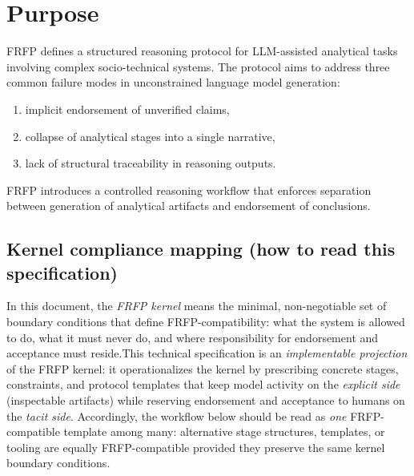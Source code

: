 
\section{Purpose}

FRFP defines a structured reasoning protocol for LLM-assisted analytical tasks involving complex socio-technical systems. The protocol aims to address three common failure modes in unconstrained language model generation:

\begin{enumerate}
\item implicit endorsement of unverified claims,
\item collapse of analytical stages into a single narrative,
\item lack of structural traceability in reasoning outputs.
\end{enumerate}

FRFP introduces a controlled reasoning workflow that enforces separation between generation of analytical artifacts and endorsement of conclusions.

\subsection*{Kernel compliance mapping (how to read this specification)}
In this document, the \emph{FRFP kernel} means the minimal, non-negotiable set of boundary conditions that
define FRFP-compatibility: what the system is allowed to do, what it must never do, and where responsibility
for endorsement and acceptance must reside.This technical specification is an \emph{implementable projection} of the FRFP kernel: it operationalizes the
kernel by prescribing concrete stages, constraints, and protocol templates that keep model activity on the
\emph{explicit side} (inspectable artifacts) while reserving endorsement and acceptance to humans on the
\emph{tacit side}. Accordingly, the workflow below should be read as \emph{one} FRFP-compatible template among
many: alternative stage structures, templates, or tooling are equally FRFP-compatible provided they preserve
the same kernel boundary conditions.

